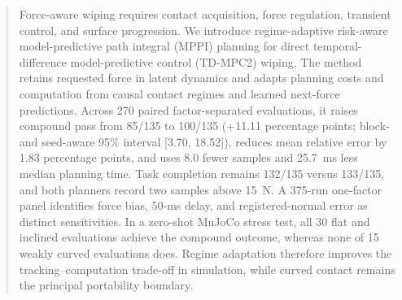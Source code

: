 \begin{abstract}
Force-aware wiping requires contact acquisition, force regulation, transient
control, and surface progression. We introduce regime-adaptive risk-aware
model-predictive path integral (MPPI) planning for direct temporal-difference
model-predictive control (TD-MPC2) wiping. The method retains requested force
in latent dynamics and adapts planning costs and computation from causal
contact regimes and learned next-force predictions. Across 270 paired
factor-separated evaluations, it raises compound pass from 85/135 to 100/135
(+11.11 percentage points; block- and seed-aware 95\% interval [3.70, 18.52]),
reduces mean relative error by 1.83 percentage points, and uses 8.0 fewer samples and
25.7~ms less median planning time. Task completion remains 132/135 versus
133/135, and both planners record two samples above 15~N. A 375-run one-factor
panel identifies force bias, 50-ms delay, and registered-normal error as
distinct sensitivities. In a zero-shot MuJoCo stress test, all 30 flat and
inclined evaluations achieve the compound outcome, whereas none of 15 weakly
curved evaluations does. Regime adaptation therefore improves the
tracking--computation trade-off in simulation, while curved contact remains
the principal portability boundary.
\end{abstract}
